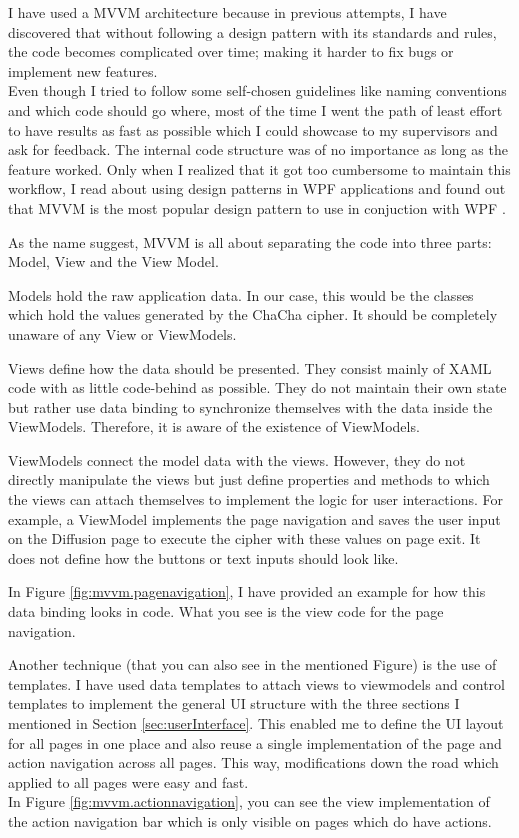 I have used a MVVM architecture because in previous attempts, I have discovered that without following a design pattern with its standards and rules, the code becomes complicated over time; making it harder to fix bugs or implement new features. \\
Even though I tried to follow some self-chosen guidelines like naming conventions and which code should go where, most of the time I went the path of least effort to have results as fast as possible which I could showcase to my supervisors and ask for feedback. The internal code structure was of no importance as long as the feature worked. Only when I realized that it got too cumbersome to maintain this workflow, I read about using design patterns in WPF applications and found out that MVVM is the most popular design pattern to use in conjuction with WPF \cite{mvvm-wpf}.

As the name suggest, MVVM is all about separating the code into three parts: Model, View and the View Model.

Models hold the raw application data. In our case, this would be the classes which hold the values generated by the ChaCha cipher. It should be completely unaware of any View or ViewModels.

Views define how the data should be presented. They consist mainly of XAML code with as little code-behind as possible. They do not maintain their own state but rather use data binding to synchronize themselves with the data inside the ViewModels. Therefore, it is aware of the existence of ViewModels.

ViewModels connect the model data with the views. However, they do not directly manipulate the views but just define properties and methods to which the views can attach themselves to implement the logic for user interactions. For example, a ViewModel implements the page navigation and saves the user input on the Diffusion page to execute the cipher with these values on page exit. It does not define how the buttons or text inputs should look like.

In Figure \ref{fig:mvvm.pagenavigation}, I have provided an example for how this data binding looks in code. What you see is the view code for the page navigation.

Another technique (that you can also see in the mentioned Figure) is the use of templates. I have used data templates to attach views to viewmodels and control templates to implement the general UI structure with the three sections I mentioned in Section \ref{sec:userInterface}. This enabled me to define the UI layout for all pages in one place and also reuse a single implementation of the page and action navigation across all pages. This way, modifications down the road which applied to all pages were easy and fast. \\ In Figure \ref{fig:mvvm.actionnavigation}, you can see the view implementation of the action navigation bar which is only visible on pages which do have actions.


